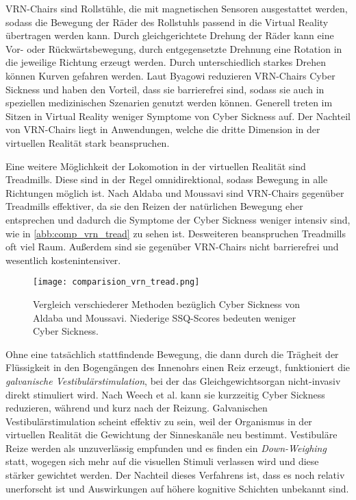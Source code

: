 VRN-Chairs sind Rollst\"uhle, die mit magnetischen Sensoren ausgestattet werden, sodass die Bewegung der R\"ader des Rollstuhls passend in die Virtual Reality \"ubertragen werden kann. Durch gleichgerichtete Drehung der R\"ader kann eine Vor- oder R\"uckw\"artsbewegung, durch entgegensetzte Drehnung eine Rotation in die jeweilige Richtung erzeugt werden. Durch unterschiedlich starkes Drehen k\"onnen Kurven gefahren werden. Laut Byagowi\cite{Byagowi:2014:VRNchair} reduzieren VRN-Chairs Cyber Sickness und haben den Vorteil, dass sie barrierefrei sind, sodass sie auch in speziellen medizinischen Szenarien genutzt werden k\"onnen. Generell treten im Sitzen in Virtual Reality weniger Symptome von Cyber Sickness auf. Der Nachteil von VRN-Chairs liegt in Anwendungen, welche die dritte Dimension in der virtuellen Realit\"at stark beanspruchen.

Eine weitere M\"oglichkeit der Lokomotion in der virtuellen Realit\"at sind Treadmills. Diese sind in der Regel omnidirektional, sodass Bewegung in alle Richtungen m\"oglich ist. Nach Aldaba und Moussavi\cite{Aldaba:2019:VRNTread} sind VRN-Chairs gegen\"uber Treadmills effektiver, da sie den Reizen der nat\"urlichen Bewegung eher entsprechen und dadurch die Symptome der Cyber Sickness weniger intensiv sind, wie in \autoref{abb:comp_vrn_tread} zu sehen ist. Desweiteren beanspruchen Treadmills oft viel Raum. Au{\ss}erdem sind sie gegen\"uber VRN-Chairs nicht barrierefrei und wesentlich kostenintensiver.

\begin{figure}[h]
	\centering 
	\texttt{[image: comparision\_vrn\_tread.png]}
	\caption{Vergleich verschiederer Methoden bez\"uglich Cyber Sickness von Aldaba und Moussavi\cite{Aldaba:2019:VRNTread}. Niederige SSQ-Scores bedeuten weniger Cyber Sickness.}
	\label{abb:comp_vrn_tread}
\end{figure}

Ohne eine tats\"achlich stattfindende Bewegung, die dann durch die Tr\"agheit der Fl\"ussigkeit in den Bogeng\"angen des Innenohrs einen Reiz erzeugt, funktioniert die \textit{galvanische Vestibul\"arstimulation}, bei der das Gleichgewichtsorgan nicht-invasiv direkt stimuliert wird. Nach Weech et al.\cite{Weech:2020:GVS} kann sie kurzzeitig Cyber Sickness reduzieren, w\"ahrend und kurz nach der Reizung.
Galvanischen Vestibul\"arstimulation scheint effektiv zu sein, weil der Organismus in der virtuellen Realit\"at die Gewichtung der Sinneskan\"ale neu bestimmt. Vestibul\"are Reize werden als unzuverl\"assig empfunden und es finden ein \textit{Down-Weighing} statt, wogegen sich mehr auf die visuellen Stimuli verlassen wird und diese st\"arker gewichtet werden.
Der Nachteil dieses Verfahrens ist, dass es noch relativ unerforscht ist und Auswirkungen auf h\"ohere kognitive Schichten unbekannt sind.

